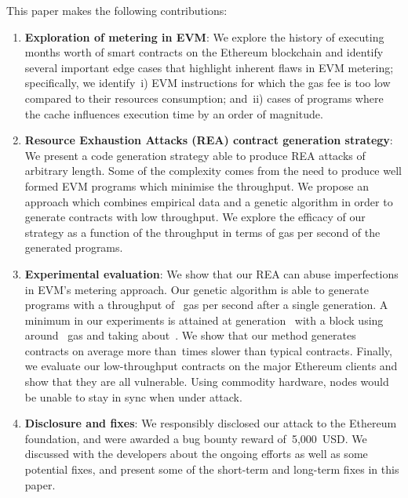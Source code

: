 This paper makes the following contributions:
\begin{enumerate}
    \item \textbf{Exploration of metering in EVM}: We explore the history of executing~\empirical{\Months} months worth of smart contracts on the Ethereum blockchain and identify several important edge cases that highlight inherent flaws in EVM metering; specifically, we identify~i) EVM instructions for which the gas fee is too low compared to their resources consumption; and~ii) cases of programs where the cache influences execution time by an order of magnitude.
    
	
    \item \textbf{Resource Exhaustion Attacks (REA) contract generation strategy}: We present a code generation strategy able to produce REA attacks of arbitrary length. Some of the complexity comes from the need to produce well formed EVM programs which minimise the throughput. We propose an approach which combines empirical data and a genetic algorithm in order to generate contracts with low throughput. We explore the efficacy of our strategy as a function of the throughput in terms of gas per second of the generated programs.
	\item \textbf{Experimental evaluation}:
	We show that our REA can abuse imperfections in EVM's metering approach. Our genetic algorithm is able to generate programs with a throughput of~ gas per second after a single generation. A minimum in our experiments is attained at generation~ with a block using around~ gas and taking about~. We show that our method generates contracts on average more than~\Slowdown times slower than typical contracts. Finally, we evaluate our low-throughput contracts on the major Ethereum clients and show that they are all vulnerable. Using commodity hardware, nodes would be unable to stay in sync when under attack.
\item \textbf{Disclosure and fixes}:
  We responsibly disclosed our attack to the Ethereum foundation, and were awarded a bug bounty reward of~5,000~USD. We discussed with the developers about the ongoing efforts as well as some potential fixes, and present some of the short-term and long-term fixes in this paper.
\end{enumerate}

